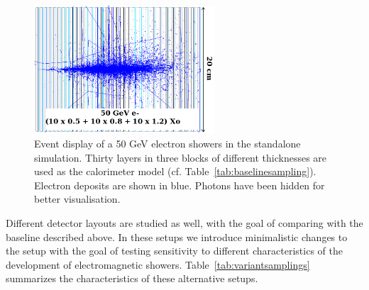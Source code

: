 \begin{figure}[h!]
  \begin{center}
    \includegraphics[width=0.6\textwidth]{figures/e_50GeV_concept_v3.png}
    \caption{Event display of a 50 GeV electron showers in the
      standalone simulation. Thirty layers in three blocks of different
      thicknesses are used as the calorimeter model (cf. Table~\ref{tab:baselinesampling}). 
      Electron deposits are shown in blue. Photons have been hidden
      for better visualisation.}
    \label{fig:g4vis}
  \end{center}
\end{figure}

Different detector layouts are studied as well, with the goal of comparing with the
baseline described above. In these setups we introduce minimalistic
changes to the setup with the goal of testing sensitivity to different
characteristics of the development of electromagnetic showers.
Table~\ref{tab:variantsamplings} summarizes the characteristics of
these alternative setups.

